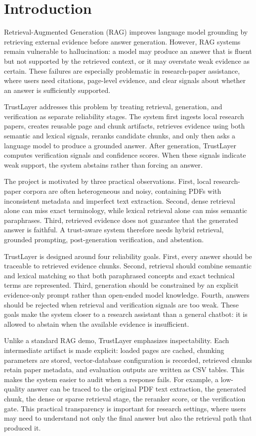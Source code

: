\documentclass[11pt]{article}
\begin{document}
\section{Introduction}

Retrieval-Augmented Generation (RAG) improves language model grounding by retrieving external evidence before answer generation. However, RAG systems remain vulnerable to hallucination: a model may produce an answer that is fluent but not supported by the retrieved context, or it may overstate weak evidence as certain. These failures are especially problematic in research-paper assistance, where users need citations, page-level evidence, and clear signals about whether an answer is sufficiently supported.

TrustLayer addresses this problem by treating retrieval, generation, and verification as separate reliability stages. The system first ingests local research papers, creates reusable page and chunk artifacts, retrieves evidence using both semantic and lexical signals, reranks candidate chunks, and only then asks a language model to produce a grounded answer. After generation, TrustLayer computes verification signals and confidence scores. When these signals indicate weak support, the system abstains rather than forcing an answer.

The project is motivated by three practical observations. First, local research-paper corpora are often heterogeneous and noisy, containing PDFs with inconsistent metadata and imperfect text extraction. Second, dense retrieval alone can miss exact terminology, while lexical retrieval alone can miss semantic paraphrases. Third, retrieved evidence does not guarantee that the generated answer is faithful. A trust-aware system therefore needs hybrid retrieval, grounded prompting, post-generation verification, and abstention.

TrustLayer is designed around four reliability goals. First, every answer should be traceable to retrieved evidence chunks. Second, retrieval should combine semantic and lexical matching so that both paraphrased concepts and exact technical terms are represented. Third, generation should be constrained by an explicit evidence-only prompt rather than open-ended model knowledge. Fourth, answers should be rejected when retrieval and verification signals are too weak. These goals make the system closer to a research assistant than a general chatbot: it is allowed to abstain when the available evidence is insufficient.

Unlike a standard RAG demo, TrustLayer emphasizes inspectability. Each intermediate artifact is made explicit: loaded pages are cached, chunking parameters are stored, vector-database configuration is recorded, retrieved chunks retain paper metadata, and evaluation outputs are written as CSV tables. This makes the system easier to audit when a response fails. For example, a low-quality answer can be traced to the original PDF text extraction, the generated chunk, the dense or sparse retrieval stage, the reranker score, or the verification gate. This practical transparency is important for research settings, where users may need to understand not only the final answer but also the retrieval path that produced it.
\end{document}
